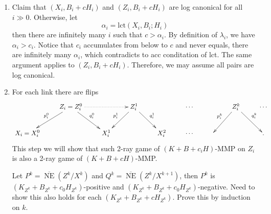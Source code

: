\documentclass{article}
\begin{document}
\begin{enumerate}[Step 1]
  \item Claim that $ (X_i,B_i+cH_i) $ and $ (Z_i,B_i+cH_i) $ are log canonical for all $ i\gg 0 $. Otherwise, let
  \[ \alpha_i=\mathrm{lct}(X_i,B_i;H_i) \]
  then there are infinitely many $ i $ such that $ c>\alpha_i $. By definition of $ \lambda_i $, we have $ \alpha_i>c_i $. Notice that $ c_i $ accumulates from below to $ c $ and never equals, there are infinitely many $ \alpha_i $, which contradicts to acc conditation of lct. The same argument applies to $ (Z_i,B_i+cH_i) $. Therefore, we may assume all pairs are log canonical.
  \item For each link there are flips
  \[ \xymatrix{
    &Z_{i}=Z_i^0\ar[ld]_{p^0_i}\ar[dr]^{q^0_i}\ar@{.>}[rr]&&Z_i^1\ar[ld]_{p^1_i}\ar[rd]^{q^1_i}&&\cdots&&Z_i^k\ar[ld]_{p^k_i}\ar[dr]^{q^k_i}&\cdots\\
    X_i=X^0_i &&X^1_i&&X_i^2&\cdots&&&
.}\]
  This step we will show that such 2-ray game of $ (K+B+c_iH) $-MMP on $ Z_i $ is also a 2-ray game of $ (K+B+cH) $-MMP.

  Let $ P^k=\overline{\operatorname{NE}}(Z^k/X^k) $ and $ Q^k=\overline{\operatorname{NE}}(Z^k/X^{k+1}) $, then $ P^k $ is $ (K_{Z^k}+B_{Z^k}+c_0H_{Z^k}) $-positive and $ (K_{Z^k}+B_{Z^k}+c_0H_{Z^k}) $-negative. Need to show this also holds for each $ (K_{Z^k}+B_{Z^k}+cH_{Z^k}) $. Prove this by induction on $ k $.
  

\end{enumerate}
\end{document}
